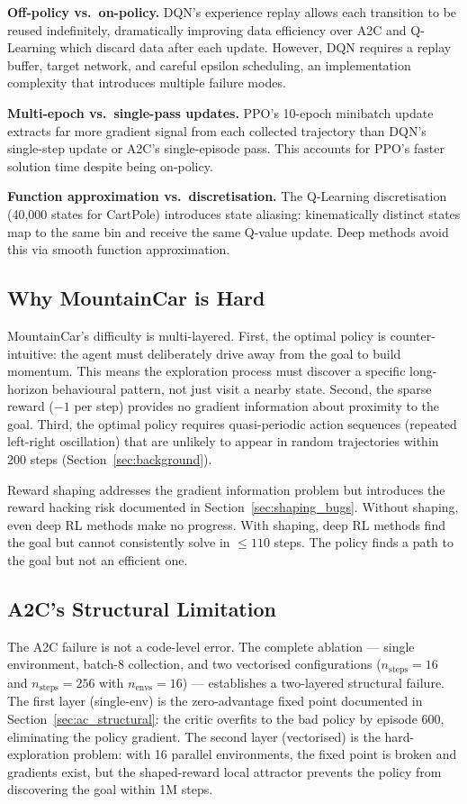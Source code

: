 \documentclass[a4paper,12pt]{article}
\begin{document}
\textbf{Off-policy vs.\ on-policy.} DQN's experience replay allows each transition to be reused indefinitely, dramatically improving data efficiency over A2C and Q-Learning which discard data after each update. However, DQN requires a replay buffer, target network, and careful epsilon scheduling, an implementation complexity that introduces multiple failure modes.

\textbf{Multi-epoch vs.\ single-pass updates.} PPO's 10-epoch minibatch update extracts far more gradient signal from each collected trajectory than DQN's single-step update or A2C's single-episode pass. This accounts for PPO's faster solution time despite being on-policy.

\textbf{Function approximation vs.\ discretisation.} The Q-Learning discretisation (40,000 states for CartPole) introduces state aliasing: kinematically distinct states map to the same bin and receive the same Q-value update. Deep methods avoid this via smooth function approximation.

\subsection{Why MountainCar is Hard}

MountainCar's difficulty is multi-layered. First, the optimal policy is counter-intuitive: the agent must deliberately drive away from the goal to build momentum. This means the exploration process must discover a specific long-horizon behavioural pattern, not just visit a nearby state. Second, the sparse reward ($-1$ per step) provides no gradient information about proximity to the goal. Third, the optimal policy requires quasi-periodic action sequences (repeated left-right oscillation) that are unlikely to appear in random trajectories within 200 steps (Section~\ref{sec:background}).

Reward shaping addresses the gradient information problem but introduces the reward hacking risk documented in Section~\ref{sec:shaping_bugs}. Without shaping, even deep RL methods make no progress. With shaping, deep RL methods find the goal but cannot consistently solve in $\leq110$ steps. The policy finds a path to the goal but not an efficient one.

\subsection{A2C's Structural Limitation}

The A2C failure is not a code-level error. The complete ablation --- single environment, batch-8 collection, and two vectorised configurations ($n_\text{steps}=16$ and $n_\text{steps}=256$ with $n_\text{envs}=16$) --- establishes a two-layered structural failure. The first layer (single-env) is the zero-advantage fixed point documented in Section~\ref{sec:ac_structural}: the critic overfits to the bad policy by episode 600, eliminating the policy gradient. The second layer (vectorised) is the hard-exploration problem: with 16 parallel environments, the fixed point is broken and gradients exist, but the shaped-reward local attractor prevents the policy from discovering the goal within 1M steps.
\end{document}
